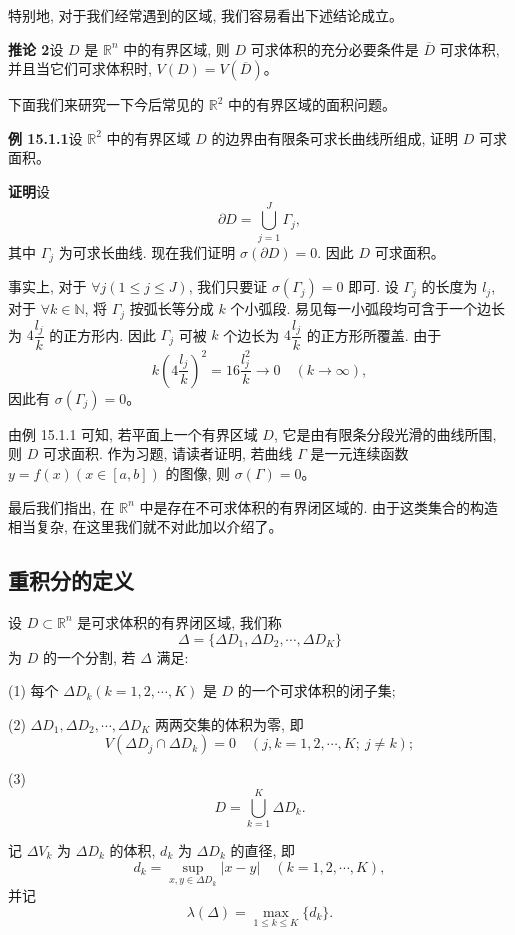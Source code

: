 \documentclass[UTF8,12pt,a4paper,fontset=fandol]{ctexart}
\begin{document}
特别地, 对于我们经常遇到的区域, 我们容易看出下述结论成立。

\noindent\textbf{推论 2}\quad 设 $D$ 是 $\mathbb R^n$ 中的有界区域, 则 $D$ 可求体积的充分必要条件是 $\overline D$ 可求体积, 并且当它们可求体积时, $V(D)=V(\overline D)$。

下面我们来研究一下今后常见的 $\mathbb R^2$ 中的有界区域的面积问题。

\noindent\textbf{例 15.1.1}\quad 设 $\mathbb R^2$ 中的有界区域 $D$ 的边界由有限条可求长曲线所组成, 证明 $D$ 可求面积。

\noindent\textbf{证明}\quad 设
\[
  \partial D=\bigcup_{j=1}^J\Gamma_j,
\]
其中 $\Gamma_j$ 为可求长曲线. 现在我们证明 $\sigma(\partial D)=0$. 因此 $D$ 可求面积。

事实上, 对于 $\forall j(1\leqslant j\leqslant J)$, 我们只要证 $\sigma(\Gamma_j)=0$ 即可. 设 $\Gamma_j$ 的长度为 $l_j$, 对于 $\forall k\in\mathbb N$, 将 $\Gamma_j$ 按弧长等分成 $k$ 个小弧段. 易见每一小弧段均可含于一个边长为 $4\dfrac{l_j}{k}$ 的正方形内. 因此 $\Gamma_j$ 可被 $k$ 个边长为 $4\dfrac{l_j}{k}$ 的正方形所覆盖. 由于
\[
  k\left(4\frac{l_j}{k}\right)^2=16\frac{l_j^2}{k}\to0\quad (k\to\infty),
\]
因此有 $\sigma(\Gamma_j)=0$。

由例 15.1.1 可知, 若平面上一个有界区域 $D$, 它是由有限条分段光滑的曲线所围, 则 $D$ 可求面积. 作为习题, 请读者证明, 若曲线 $\Gamma$ 是一元连续函数 $y=f(x)(x\in[a,b])$ 的图像, 则 $\sigma(\Gamma)=0$。

最后我们指出, 在 $\mathbb R^n$ 中是存在不可求体积的有界闭区域的. 由于这类集合的构造相当复杂, 在这里我们就不对此加以介绍了。

\subsection{重积分的定义}

设 $D\subset\mathbb R^n$ 是可求体积的有界闭区域, 我们称
\[
  \Delta=\{\Delta D_1,\Delta D_2,\cdots,\Delta D_K\}
\]
为 $D$ 的一个分割, 若 $\Delta$ 满足:

(1) 每个 $\Delta D_k(k=1,2,\cdots,K)$ 是 $D$ 的一个可求体积的闭子集;

(2) $\Delta D_1,\Delta D_2,\cdots,\Delta D_K$ 两两交集的体积为零, 即
\[
  V(\Delta D_j\cap\Delta D_k)=0\quad (j,k=1,2,\cdots,K;\ j\ne k);
\]

(3)
\[
  D=\bigcup_{k=1}^K\Delta D_k.
\]

记 $\Delta V_k$ 为 $\Delta D_k$ 的体积, $d_k$ 为 $\Delta D_k$ 的直径, 即
\[
  d_k=\sup_{x,y\in\Delta D_k}|x-y|\quad (k=1,2,\cdots,K),
\]
并记
\[
  \lambda(\Delta)=\max_{1\leqslant k\leqslant K}\{d_k\}.
\]
\end{document}
